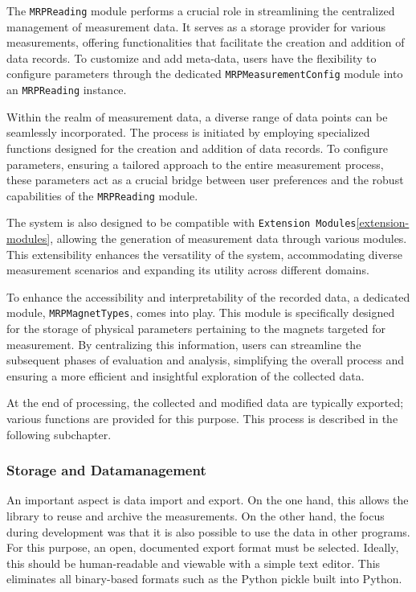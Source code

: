The \passthrough{\lstinline!MRPReading!} module performs a crucial role
in streamlining the centralized management of measurement data. It
serves as a storage provider for various measurements, offering
functionalities that facilitate the creation and addition of data
records. To customize and add meta-data, users have the flexibility to
configure parameters through the dedicated
\passthrough{\lstinline!MRPMeasurementConfig!} module into an
\passthrough{\lstinline!MRPReading!} instance.

Within the realm of measurement data, a diverse range of data points can
be seamlessly incorporated. The process is initiated by employing
specialized functions designed for the creation and addition of data
records. To configure parameters, ensuring a tailored approach to the
entire measurement process, these parameters act as a crucial bridge
between user preferences and the robust capabilities of the
\passthrough{\lstinline!MRPReading!} module.

The system is also designed to be compatible with
\passthrough{\lstinline!Extension Modules!}\ref{extension-modules},
allowing the generation of measurement data through various modules.
This extensibility enhances the versatility of the system, accommodating
diverse measurement scenarios and expanding its utility across different
domains.

To enhance the accessibility and interpretability of the recorded data,
a dedicated module, \passthrough{\lstinline!MRPMagnetTypes!}, comes into
play. This module is specifically designed for the storage of physical
parameters pertaining to the magnets targeted for measurement. By
centralizing this information, users can streamline the subsequent
phases of evaluation and analysis, simplifying the overall process and
ensuring a more efficient and insightful exploration of the collected
data.

At the end of processing, the collected and modified data are typically
exported; various functions are provided for this purpose. This process
is described in the following subchapter.

\hypertarget{storage-and-datamanagement}{%
\subsubsection{Storage and
Datamanagement}\label{storage-and-datamanagement}}

An important aspect is data import and export. On the one hand, this
allows the library to reuse and archive the measurements. On the other
hand, the focus during development was that it is also possible to use
the data in other programs. For this purpose, an open, documented export
format must be selected. Ideally, this should be human-readable and
viewable with a simple text editor. This eliminates all binary-based
formats such as the Python pickle built into Python.

